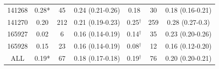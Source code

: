 \begin{table}
\begin{tabular}[t]{ccccccc}
141268 & 0.28* & 45 & 0.24 (0.21-0.26) & 0.18 & 30 & 0.18 (0.16-0.21)\\
141270 & 0.20 & 212 & 0.21 (0.19-0.23) & 0.25$^{\dagger}$ & 259 & 0.28 (0.27-0.3)\\
165927 & 0.02 & 6 & 0.16 (0.14-0.19) & 0.14$^{\dagger}$ & 35 & 0.23 (0.20-0.26)\\
165928 & 0.15 & 23 & 0.16 (0.14-0.19) & 0.08$^{\dagger}$ & 12 & 0.16 (0.12-0.20)\\
ALL & 0.19* & 67 & 0.18 (0.17-0.18) & 0.19$^{\dagger}$ & 76 & 0.20 (0.20-0.21)\\
\bottomrule
\end{tabular}
\end{table}

\clearpage


